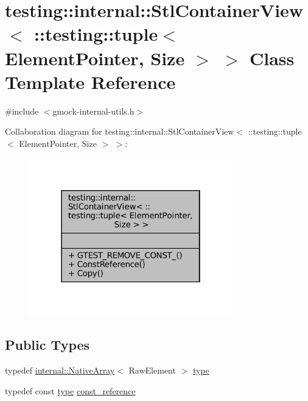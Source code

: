 \hypertarget{classtesting_1_1internal_1_1StlContainerView_3_01_1_1testing_1_1tuple_3_01ElementPointer_00_01Size_01_4_01_4}{}\section{testing\+:\+:internal\+:\+:Stl\+Container\+View$<$ \+:\+:testing\+:\+:tuple$<$ Element\+Pointer, Size $>$ $>$ Class Template Reference}
\label{classtesting_1_1internal_1_1StlContainerView_3_01_1_1testing_1_1tuple_3_01ElementPointer_00_01Size_01_4_01_4}


{\ttfamily \#include $<$gmock-\/internal-\/utils.\+h$>$}



Collaboration diagram for testing\+:\+:internal\+:\+:Stl\+Container\+View$<$ \+:\+:testing\+:\+:tuple$<$ Element\+Pointer, Size $>$ $>$\+:
\nopagebreak
\begin{figure}[H]
\begin{center}
\leavevmode
\includegraphics[width=250pt]{classtesting_1_1internal_1_1StlContainerView_3_01_1_1testing_1_1tuple_3_01ElementPointer_00_01Size_01_4_01_4__coll__graph}
\end{center}
\end{figure}
\subsection*{Public Types}
\begin{DoxyCompactItemize}
\item 
typedef \hyperlink{classtesting_1_1internal_1_1NativeArray}{internal\+::\+Native\+Array}$<$ Raw\+Element $>$ \hyperlink{classtesting_1_1internal_1_1StlContainerView_3_01_1_1testing_1_1tuple_3_01ElementPointer_00_01Size_01_4_01_4_aedefb897170f76518afbca6f87b5467c}{type}
\item 
typedef const \hyperlink{classtesting_1_1internal_1_1StlContainerView_3_01_1_1testing_1_1tuple_3_01ElementPointer_00_01Size_01_4_01_4_aedefb897170f76518afbca6f87b5467c}{type} \hyperlink{classtesting_1_1internal_1_1StlContainerView_3_01_1_1testing_1_1tuple_3_01ElementPointer_00_01Size_01_4_01_4_a4c69a4e22173b0e6f3eb55636d6a38f1}{const\+\_\+reference}
\end{DoxyCompactItemize}
